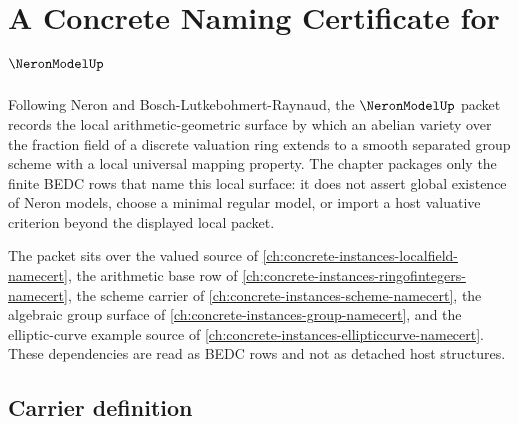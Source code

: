\chapter{A Concrete Naming Certificate for $\NeronModelUp$}
\label{ch:concrete-instances-neron-model-namecert}

Following Neron and Bosch-Lutkebohmert-Raynaud, the $\NeronModelUp$ packet records the local arithmetic-geometric surface by which an abelian variety over the fraction field of a discrete valuation ring extends to a smooth separated group scheme with a local universal mapping property. The chapter packages only the finite BEDC rows that name this local surface: it does not assert global existence of Neron models, choose a minimal regular model, or import a host valuative criterion beyond the displayed local packet.

The packet sits over the valued source of \autoref{ch:concrete-instances-localfield-namecert}, the arithmetic base row of \autoref{ch:concrete-instances-ringofintegers-namecert}, the scheme carrier of \autoref{ch:concrete-instances-scheme-namecert}, the algebraic group surface of \autoref{ch:concrete-instances-group-namecert}, and the elliptic-curve example source of \autoref{ch:concrete-instances-ellipticcurve-namecert}. These dependencies are read as BEDC rows and not as detached host structures.

\section{Carrier definition}
\label{sec:neron-model-carrier}

